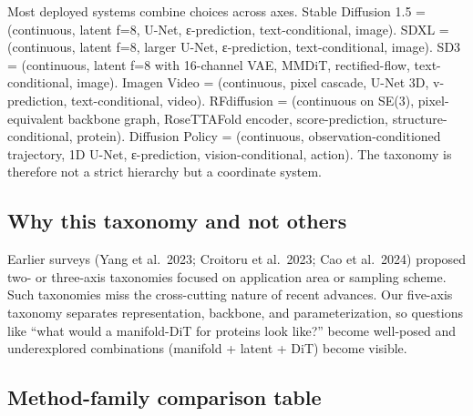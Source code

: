 Most deployed systems combine choices across axes. Stable Diffusion 1.5 = (continuous, latent f=8, U-Net, ε-prediction, text-conditional, image). SDXL = (continuous, latent f=8, larger U-Net, ε-prediction, text-conditional, image). SD3 = (continuous, latent f=8 with 16-channel VAE, MMDiT, rectified-flow, text-conditional, image). Imagen Video = (continuous, pixel cascade, U-Net 3D, v-prediction, text-conditional, video). RFdiffusion = (continuous on SE(3), pixel-equivalent backbone graph, RoseTTAFold encoder, score-prediction, structure-conditional, protein). Diffusion Policy = (continuous, observation-conditioned trajectory, 1D U-Net, ε-prediction, vision-conditional, action). The taxonomy is therefore not a strict hierarchy but a coordinate system.

\subsection{Why this taxonomy and not others}\label{why-this-taxonomy-and-not-others}

Earlier surveys (Yang et al.~2023; Croitoru et al.~2023; Cao et al.~2024) proposed two- or three-axis taxonomies focused on application area or sampling scheme. Such taxonomies miss the cross-cutting nature of recent advances. Our five-axis taxonomy separates representation, backbone, and parameterization, so questions like ``what would a manifold-DiT for proteins look like?'' become well-posed and underexplored combinations (manifold + latent + DiT) become visible.

\subsection{Method-family comparison table}\label{method-family-comparison-table}

